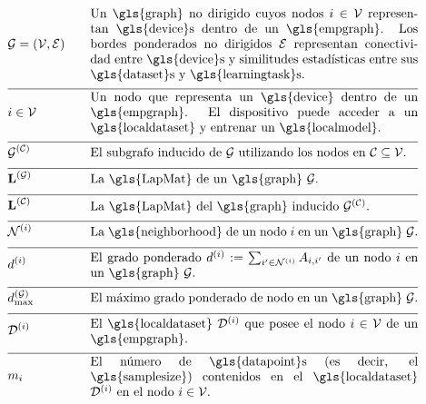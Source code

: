 \begin{align}
 	&\graph = \pair{\nodes}{\edges} & \quad & \parbox{.75\textwidth}{Un \gls{graph} no dirigido cuyos nodos $\nodeidx \in \nodes$ representan 
	\gls{device}s dentro de un \gls{empgraph}. Los bordes ponderados no dirigidos $\edges$ representan conectividad entre 
	\gls{device}s y similitudes estadísticas entre sus \gls{dataset}s y \gls{learningtask}s.}\nonumber \\[2mm] \hline \nonumber\\[-5mm]
&\nodeidx \in \nodes& \quad & \parbox{.75\textwidth}{Un nodo que representa un 
	\gls{device} dentro de un \gls{empgraph}. El dispositivo puede acceder a un \gls{localdataset} y entrenar un \gls{localmodel}.}\nonumber \\[2mm] \hline \nonumber\\[-5mm]
	&\indsubgraph{\graph}{\cluster}& \quad & \parbox{.75\textwidth}{El subgrafo inducido de $\graph$ utilizando los nodos en $\cluster \subseteq \nodes$.} \nonumber \\[2mm] \hline \nonumber\\[-5mm]
	&\LapMat{\graph}   & \quad & \parbox{.75\textwidth}{La \gls{LapMat} de un \gls{graph} $\graph$.}\nonumber \\[2mm] \hline \nonumber\\[-5mm]
		&\LapMat{\cluster}   & \quad & \parbox{.75\textwidth}{La \gls{LapMat} del \gls{graph} inducido $\indsubgraph{\graph}{\cluster}$.} \nonumber \\[2mm] \hline \nonumber\\[-5mm]
	 &		\neighbourhood{\nodeidx}  & \quad & \parbox{.75\textwidth}{La \gls{neighborhood} de un nodo $\nodeidx$ en un \gls{graph} $\graph$.}   \nonumber \\[2mm] \hline \nonumber\\[-5mm]
	&\nodedegree{\nodeidx} & \quad & \parbox{.75\textwidth}{El grado ponderado $\nodedegree{\nodeidx}\defeq \sum_{\nodeidx' \in \neighbourhood{\nodeidx}} \edgeweight_{\nodeidx,\nodeidx'}$ de un nodo $\nodeidx$ en un \gls{graph} $\graph$.}  \nonumber \\[2mm] \hline \nonumber\\[-5mm]
	&\maxnodedegree^{(\graph)} & \quad & \parbox{.75\textwidth}{El máximo grado ponderado de nodo en un \gls{graph} $\graph$.} \nonumber \\[2mm] \hline \nonumber\\[-5mm] 
&\localdataset{\nodeidx} & \quad & \parbox{.75\textwidth}{El \gls{localdataset} $\localdataset{\nodeidx}$ que posee el 
			nodo $\nodeidx\in \nodes$ de un \gls{empgraph}.} \nonumber \\[2mm] \hline \nonumber\\[-5mm]
&\localsamplesize{\nodeidx} & \quad & \parbox{.75\textwidth}{El número de \gls{datapoint}s (es decir, el \gls{samplesize}) contenidos en el 
			\gls{localdataset} $\localdataset{\nodeidx}$ en el nodo $\nodeidx\in \nodes$.} \nonumber 
\end{align} 

